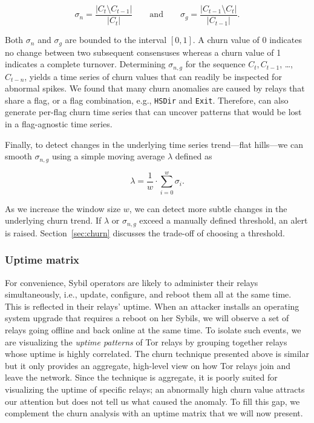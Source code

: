 \begin{equation}
\sigma_{n} = \frac{\lvert C_{t} \setminus C_{t-1} \rvert}
{\lvert C_{t} \rvert}
\qquad\text{and}\qquad
\sigma_{g} = \frac{\lvert C_{t-1} \setminus C_{t} \rvert}
{\lvert C_{t-1} \rvert}.
\end{equation}

Both $\sigma_{n}$ and $\sigma_{g}$ are bounded to the interval $[0, 1]$.  A
churn value of 0 indicates no change between two subsequent consensuses whereas
a churn value of 1 indicates a complete turnover.  Determining $\sigma_{n,g}$
for the sequence $C_{t}, C_{t-1}$, \ldots, $C_{t-n}$, yields a time series of
churn values that can readily be inspected for abnormal spikes.  We found that
many churn anomalies are caused by relays that share a flag, or a flag
combination, e.g., \texttt{HSDir} and \texttt{Exit}.  Therefore, \sys can
also generate per-flag churn time series that can uncover patterns that would be
lost in a flag-agnostic time series.

Finally, to detect changes in the underlying time series trend---flat hills---we
can smooth $\sigma_{n,g}$ using a simple moving average $\lambda$ defined as

\begin{equation}
\lambda = \frac{1}{w} \cdot \sum_{i=0}^{w} \sigma_{i}.
\end{equation}

As we increase the window size $w$, we can detect more subtle changes in the
underlying churn trend.  If $\lambda$ or $\sigma_{n,g}$ exceed a manually
defined threshold, an alert is raised.  Section~\ref{sec:churn} discusses the
trade-off of choosing a threshold.

\subsubsection{Uptime matrix}
\label{sec:uptime-matrix}
For convenience, Sybil operators are likely to administer their relays
simultaneously, i.e., update, configure, and reboot them all at the same time.
This is reflected in their relays' uptime.  When an attacker installs an
operating system upgrade that requires a reboot on her Sybils, we will observe a
set of relays going offline and back online at the same time.  To isolate such
events, we are visualizing the \emph{uptime patterns} of Tor relays by grouping
together relays whose uptime is highly correlated.  The churn technique
presented above is similar but it only provides an aggregate, high-level view on
how Tor relays join and leave the network.  Since the technique is aggregate, it
is poorly suited for visualizing the uptime of specific relays; an abnormally
high churn value attracts our attention but does not tell us what caused the
anomaly.  To fill this gap, we complement the churn analysis with an uptime
matrix that we will now present.

